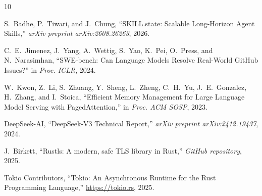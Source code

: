 \documentclass[10pt,journal,compsoc]{IEEEtran}
\begin{document}
\maketitle
\IEEEdisplaynontitleabstractindextext
\IEEEpeerreviewmaketitle








\begin{thebibliography}{10}

S.~Badhe, P.~Tiwari, and J.~Chung,
``SKILL.state: Scalable Long-Horizon Agent Skills,''
\emph{arXiv preprint arXiv:2608.26263}, 2026.

C.~E.~Jimenez, J.~Yang, A.~Wettig, S.~Yao, K.~Pei, O.~Press, and N.~Narasimhan,
``SWE-bench: Can Language Models Resolve Real-World GitHub Issues?''
in \emph{Proc. ICLR}, 2024.

W.~Kwon, Z.~Li, S.~Zhuang, Y.~Sheng, L.~Zheng, C.~H.~Yu, J.~E.~Gonzalez, H.~Zhang, and I.~Stoica,
``Efficient Memory Management for Large Language Model Serving with PagedAttention,''
in \emph{Proc. ACM SOSP}, 2023.

DeepSeek-AI,
``DeepSeek-V3 Technical Report,''
\emph{arXiv preprint arXiv:2412.19437}, 2024.

J.~Birkett,
``Rustls: A modern, safe TLS library in Rust,''
\emph{GitHub repository}, 2025.

Tokio Contributors,
``Tokio: An Asynchronous Runtime for the Rust Programming Language,''
\url{https://tokio.rs}, 2025.

\end{thebibliography}
\end{document}
